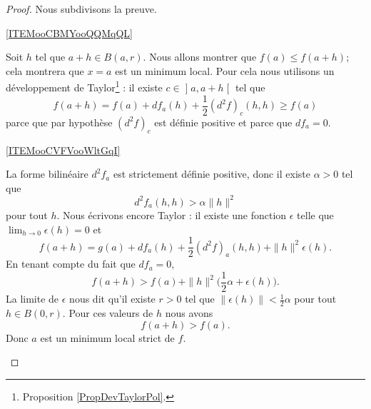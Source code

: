 \begin{proof}
    Nous subdivisons la preuve.

    \begin{subproof}

    \item[\ref{ITEMooCBMYooQQMqQL}]

    Soit \( h\) tel que \( a+h\in B(a,r)\). Nous allons montrer que \( f(a)\leq f(a+h)\); cela montrera que \( x=a\) est un minimum local. Pour cela nous utilisons un développement de Taylor\footnote{Proposition \ref{PropDevTaylorPol}.} : il existe \( c\in \mathopen] a , a+h \mathclose[\) tel que
        \begin{equation}
            f(a+h)=f(a)+df_a(h)+\frac{ 1 }{2}(d^2f)_c(h,h)\geq f(a)
        \end{equation}
        parce que par hypothèse \( (d^2f)_c\) est définie positive et parce que \( df_a=0\).

    \item[\ref{ITEMooCVFVooWltGqI}]

        La forme bilinéaire \( d^2f_a\) est strictement définie positive, donc il existe \( \alpha>0\) tel que
        \begin{equation}
            d^2f_a(h,h)>\alpha\| h \|^2
        \end{equation}
        pour tout \( h\). Nous écrivons encore Taylor : il existe une fonction \( \epsilon\) telle que \( \lim_{h\to 0} \epsilon(h)=0\) et 
        \begin{equation}
            f(a+h)=g(a)+df_a(h)+\frac{ 1 }{2}(d^2f)_a(h,h)+\| h \|^2\epsilon(h).
        \end{equation}
        En tenant compte du fait que \( df_a=0\),
        \begin{equation}
            f(a+h)>f(a)+\| h \|^2\big( \frac{ 1 }{2}\alpha+ \epsilon(h) \big).
        \end{equation}
        La limite de \( \epsilon\) nous dit qu'il existe \( r>0\) tel que \( \| \epsilon(h) \|<\frac{ 1 }{2}\alpha\) pour tout \( h\in B(0,r)\). Pour ces valeurs de \( h\) nous avons 
        \begin{equation}
            f(a+h)>f(a).
        \end{equation}
        Donc \( a\) est un minimum local strict de \( f\).


\end{subproof}
\end{proof}
